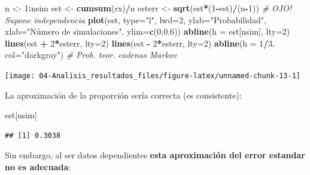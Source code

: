 \documentclass[]{book}
\newenvironment{Shaded}{\begin{snugshade}}{\end{snugshade}}
\newcommand{\KeywordTok}[1]{\textcolor[rgb]{0.13,0.29,0.53}{\textbf{#1}}}
\newcommand{\DataTypeTok}[1]{\textcolor[rgb]{0.13,0.29,0.53}{#1}}
\newcommand{\DecValTok}[1]{\textcolor[rgb]{0.00,0.00,0.81}{#1}}
\newcommand{\FloatTok}[1]{\textcolor[rgb]{0.00,0.00,0.81}{#1}}
\newcommand{\StringTok}[1]{\textcolor[rgb]{0.31,0.60,0.02}{#1}}
\newcommand{\CommentTok}[1]{\textcolor[rgb]{0.56,0.35,0.01}{\textit{#1}}}
\newcommand{\OperatorTok}[1]{\textcolor[rgb]{0.81,0.36,0.00}{\textbf{#1}}}
\newcommand{\NormalTok}[1]{#1}
\theoremstyle{definition}
\theoremstyle{definition}
\theoremstyle{definition}
\theoremstyle{remark}
\begin{document}
\begin{Shaded}
\begin{Highlighting}[]
\NormalTok{n <-}\StringTok{ }\DecValTok{1}\OperatorTok{:}\NormalTok{nsim}
\NormalTok{est <-}\StringTok{ }\KeywordTok{cumsum}\NormalTok{(rx)}\OperatorTok{/}\NormalTok{n}
\NormalTok{esterr <-}\StringTok{ }\KeywordTok{sqrt}\NormalTok{(est}\OperatorTok{*}\NormalTok{(}\DecValTok{1}\OperatorTok{-}\NormalTok{est)}\OperatorTok{/}\NormalTok{(n}\OperatorTok{-}\DecValTok{1}\NormalTok{)) }\CommentTok{# OJO! Supone independencia}
\KeywordTok{plot}\NormalTok{(est, }\DataTypeTok{type=}\StringTok{"l"}\NormalTok{, }\DataTypeTok{lwd=}\DecValTok{2}\NormalTok{, }\DataTypeTok{ylab=}\StringTok{"Probabilidad"}\NormalTok{, }
     \DataTypeTok{xlab=}\StringTok{"Número de simulaciones"}\NormalTok{, }\DataTypeTok{ylim=}\KeywordTok{c}\NormalTok{(}\DecValTok{0}\NormalTok{,}\FloatTok{0.6}\NormalTok{))}
\KeywordTok{abline}\NormalTok{(}\DataTypeTok{h =}\NormalTok{ est[nsim], }\DataTypeTok{lty=}\DecValTok{2}\NormalTok{)}
\KeywordTok{lines}\NormalTok{(est }\OperatorTok{+}\StringTok{ }\DecValTok{2}\OperatorTok{*}\NormalTok{esterr, }\DataTypeTok{lty=}\DecValTok{2}\NormalTok{) }
\KeywordTok{lines}\NormalTok{(est }\OperatorTok{-}\StringTok{ }\DecValTok{2}\OperatorTok{*}\NormalTok{esterr, }\DataTypeTok{lty=}\DecValTok{2}\NormalTok{)}
\KeywordTok{abline}\NormalTok{(}\DataTypeTok{h =} \DecValTok{1}\OperatorTok{/}\DecValTok{3}\NormalTok{, }\DataTypeTok{col=}\StringTok{"darkgray"}\NormalTok{)     }\CommentTok{# Prob. teor. cadenas Markov}
\end{Highlighting}
\end{Shaded}

\begin{center}\texttt{[image: 04-Analisis\_resultados\_files/figure-latex/unnamed-chunk-13-1]} \end{center}

La aproximación de la proporción sería correcta (es consistente):

\begin{Shaded}
\begin{Highlighting}[]
\NormalTok{est[nsim]}
\end{Highlighting}
\end{Shaded}

\begin{verbatim}
## [1] 0.3038
\end{verbatim}

Sin embargo, al ser datos dependientes \textbf{esta aproximación del
error estandar no es adecuada}:
\end{document}

